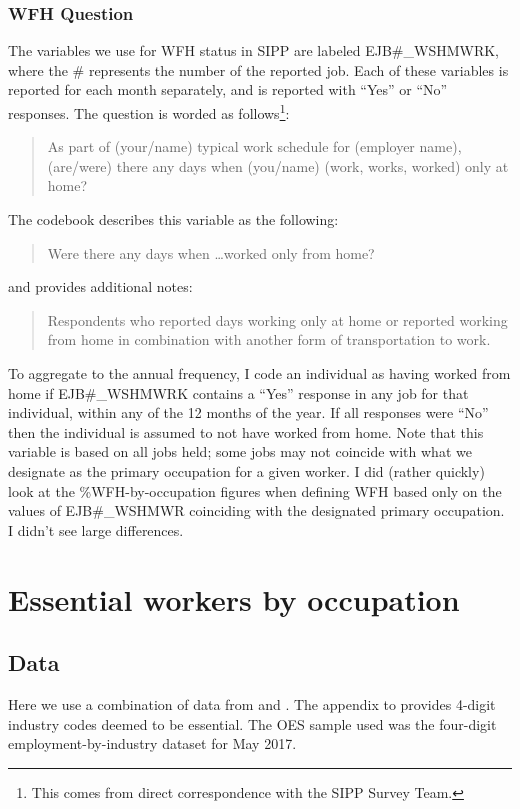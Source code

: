 \documentclass{article}
\begin{document}
\subsubsection{WFH Question}
The variables we use for WFH status in SIPP are labeled EJB\#\_WSHMWRK,
where the \# represents the number of the reported job.
Each of these variables is reported for each month separately, and is reported with ``Yes'' or ``No'' responses.
The question is worded as follows\footnote{This comes from direct correspondence with the SIPP Survey Team.}:
\begin{quote}
As part of (your/name) typical work schedule for (employer name), (are/were) there any days when (you/name) (work, works, worked) only at home?
\end{quote}

\if The codebook describes this variable as the following:
\begin{quote}
Were there any days when \ldots worked only from home?
\end{quote}
and provides additional notes:
\begin{quote}
Respondents who reported days working only at home or reported working from home in combination with another form of transportation to work.
\end{quote}
\fi
To aggregate to the annual frequency, I code an individual as having worked from home if EJB\#\_WSHMWRK contains a ``Yes'' response in any job for that individual, within any of the 12 months of the year. If all responses were ``No'' then the individual is assumed to not have worked from home.
Note that this variable is based on all jobs held; some jobs may not coincide with what we designate as the primary occupation for a given worker. I did (rather quickly) look at the \%WFH-by-occupation figures when defining WFH based only on the values of EJB\#\_WSHMWR coinciding with the designated primary occupation. I didn't see large differences.

\section{Essential workers by occupation}
\subsection{Data}
Here we use a combination of data from \cite{OES} and \cite{brookings}. The appendix to \cite{brookings} provides 4-digit industry codes deemed to be essential. The OES sample used was the four-digit employment-by-industry dataset for May 2017.
\end{document}
